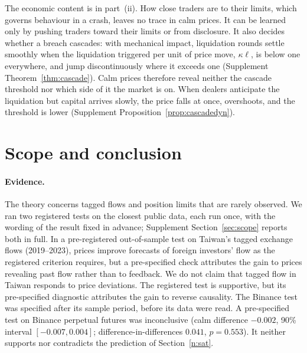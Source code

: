 The economic content is in part~(ii). How close traders are to their limits, which governs behaviour in a crash, leaves no trace in calm prices. It can be learned only by pushing traders toward their limits or from disclosure. It also decides whether a breach cascades: with mechanical impact, liquidation rounds settle smoothly when the liquidation triggered per unit of price move, $\kappa\ell$, is below one everywhere, and jump discontinuously where it exceeds one (Supplement Theorem~\ref{thm:cascade}). Calm prices therefore reveal neither the cascade threshold nor which side of it the market is on. When dealers anticipate the liquidation but capital arrives slowly, the price falls at once, overshoots, and the threshold is lower (Supplement Proposition~\ref{prop:cascadedyn}).

\section{Scope and conclusion}\label{n:concl}

\paragraph{Evidence.} The theory concerns tagged flows and position limits that are rarely observed. We ran two registered tests on the closest public data, each run once, with the wording of the result fixed in advance; Supplement Section~\ref{sec:scope} reports both in full. In a pre-registered out-of-sample test on Taiwan's tagged exchange flows (2019--2023), prices improve forecasts of foreign investors' flow as the registered criterion requires, but a pre-specified check attributes the gain to prices revealing past flow rather than to feedback. We do not claim that tagged flow in Taiwan responds to price deviations. The registered test is supportive, but its pre-specified diagnostic attributes the gain to reverse causality. The Binance test was specified after its sample period, before its data were read. A pre-specified test on Binance perpetual futures was inconclusive (calm difference $-0.002$, 90\% interval $[-0.007, 0.004]$; difference-in-differences $0.041$, $p=0.553$). It neither supports nor contradicts the prediction of Section~\ref{n:sat}.

